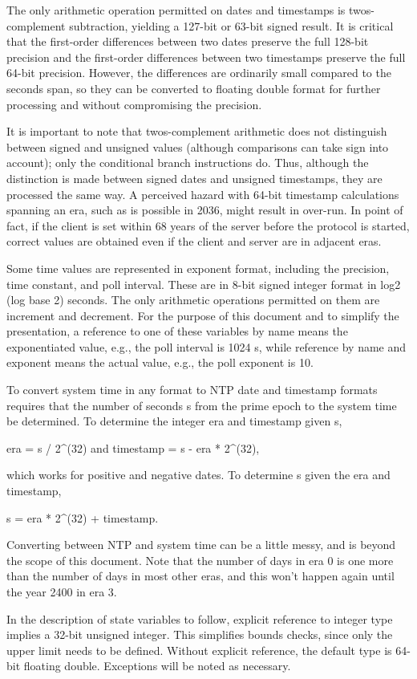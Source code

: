 The only arithmetic operation permitted on dates and timestamps is
twos-complement subtraction, yielding a 127-bit or 63-bit signed
result. It is critical that the first-order differences between two
dates preserve the full 128-bit precision and the first-order
differences between two timestamps preserve the full 64-bit
precision. However, the differences are ordinarily small compared to
the seconds span, so they can be converted to floating double format
for further processing and without compromising the precision.

It is important to note that twos-complement arithmetic does not
distinguish between signed and unsigned values (although comparisons
can take sign into account); only the conditional branch instructions
do. Thus, although the distinction is made between signed dates and
unsigned timestamps, they are processed the same way. A perceived
hazard with 64-bit timestamp calculations spanning an era, such as is
possible in 2036, might result in over-run. In point of fact, if the
client is set within 68 years of the server before the protocol is
started, correct values are obtained even if the client and server
are in adjacent eras.

Some time values are represented in exponent format, including the
precision, time constant, and poll interval. These are in 8-bit
signed integer format in log2 (log base 2) seconds. The only
arithmetic operations permitted on them are increment and decrement.
For the purpose of this document and to simplify the presentation, a
reference to one of these variables by name means the exponentiated
value, e.g., the poll interval is 1024 s, while reference by name and
exponent means the actual value, e.g., the poll exponent is 10.

To convert system time in any format to NTP date and timestamp
formats requires that the number of seconds s from the prime epoch to
the system time be determined. To determine the integer era and
timestamp given s,

era = s / 2^(32) and timestamp = s - era * 2^(32),

which works for positive and negative dates. To determine s given
the era and timestamp,

s = era * 2^(32) + timestamp.

Converting between NTP and system time can be a little messy, and is
beyond the scope of this document. Note that the number of days in
era 0 is one more than the number of days in most other eras, and
this won’t happen again until the year 2400 in era 3.

In the description of state variables to follow, explicit reference
to integer type implies a 32-bit unsigned integer. This simplifies
bounds checks, since only the upper limit needs to be defined.
Without explicit reference, the default type is 64-bit floating
double. Exceptions will be noted as necessary.
